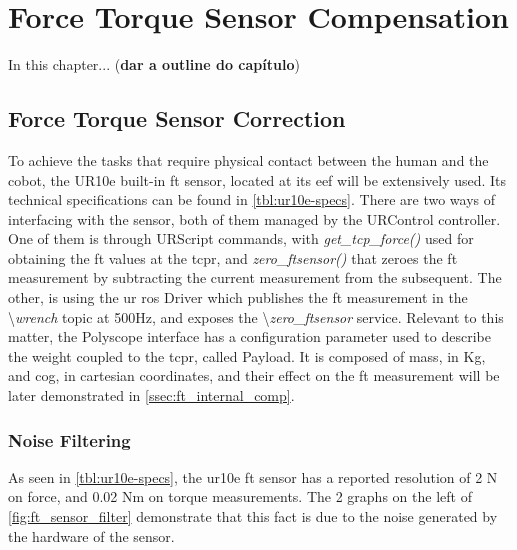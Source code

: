 \chapter{Force Torque Sensor Compensation}
\label{chapter:ft-sensor-correction}

\par In this chapter... (\textbf{dar a outline do capítulo})

\section{Force Torque Sensor Correction}

\par To achieve the tasks that require physical contact between the human and the cobot, the UR10e built-in \ac{ft} sensor, located at its \ac{eef} will be extensively used. Its technical specifications can be found in \autoref{tbl:ur10e-specs}. There are two ways of interfacing with the sensor, both of them managed by the URControl controller. One of them is through URScript commands, with \textit{get\_tcp\_force()} used for obtaining the \ac{ft} values at the \acs{tcpr}, and \textit{zero\_ftsensor()} that zeroes the \ac{ft} measurement by subtracting the current measurement from the subsequent. The other, is using the \ac{ur} \ac{ros} Driver which publishes the \ac{ft} measurement in the \textbackslash\textit{wrench} topic at 500Hz, and exposes the \textbackslash\textit{zero\_ftsensor} service. Relevant to this matter, the Polyscope interface has a configuration parameter used to describe the weight coupled to the \acs{tcpr}, called Payload. It is composed of mass, in Kg, and \ac{cog}, in cartesian coordinates, and their effect on the \ac{ft} measurement will be later demonstrated in \autoref{ssec:ft_internal_comp}.

\subsection{Noise Filtering}


\par As seen in \autoref{tbl:ur10e-specs}, the \ac{ur10e} \ac{ft} sensor has a reported resolution of 2 N on force, and 0.02 Nm on torque measurements. The 2 graphs on the left of \autoref{fig:ft_sensor_filter} demonstrate that this fact is due to the noise generated by the hardware of the sensor. 


